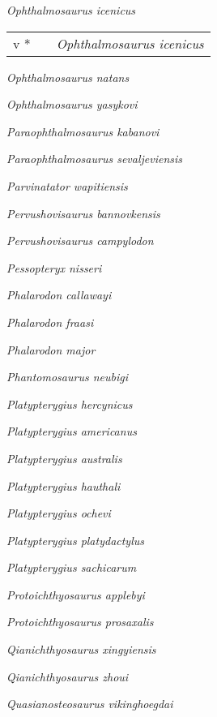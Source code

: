 \emph{Ophthalmosaurus icenicus} \cite{Seeley1874QJGSa}

\begin{tabularx}{42em}{llX}
v * & \cite*{Seeley1874QJGSa} & \emph{Ophthalmosaurus icenicus} \citeauthor*{Seeley1874QJGSa} \\
\end{tabularx}

\emph{Ophthalmosaurus natans} \cite{Marsh1879AMNH}

\emph{Ophthalmosaurus yasykovi} \cite{Efimov1999PZ}

\emph{Paraophthalmosaurus kabanovi} \cite{Efimov1999PZ}

\emph{Paraophthalmosaurus sevaljeviensis} \cite{Arkhangelsky1997PZ}

\emph{Parvinatator wapitiensis} \cite{Nicholls1995Vfateosc}

\emph{Pervushovisaurus bannovkensis} \cite{Arkhangelsky1998PJ}

\emph{Pervushovisaurus campylodon} \cite{Carter1846RBAAS}

\emph{Pessopteryx nisseri} \cite{Wiman1910BGIUa}

\emph{Phalarodon callawayi} \cite{Schmitz2004PAP}

\emph{Phalarodon fraasi} \cite{Merriam1910UCBDG}

\emph{Phalarodon major} \cite{vonHuene1916P}

\emph{Phantomosaurus neubigi} \cite{Sander1997AMR}

\emph{Platypterygius  hercynicus} \cite{Kuhn1946BNGBb}

\emph{Platypterygius americanus} \cite{Nace1939AJS}

\emph{Platypterygius australis} \cite{MCoy1867AMNH}

\emph{Platypterygius hauthali} \cite{vonHuene1927ZFMGPB}

\emph{Platypterygius ochevi} \cite{Arkhangelsky2008PJ}

\emph{Platypterygius platydactylus} \cite{Broili1907P}

\emph{Platypterygius sachicarum} \cite{Paramo1997RI}

\emph{Protoichthyosaurus applebyi} \cite{Lomax2017JVP}

\emph{Protoichthyosaurus prosaxalis} \cite{Appleby1979P}

\emph{Qianichthyosaurus xingyiensis} \cite{Yang2013ASNUP}

\emph{Qianichthyosaurus zhoui} \cite{Li1999CSB}

\emph{Quasianosteosaurus vikinghoegdai} \cite{Maisch2003NJGPAa}

